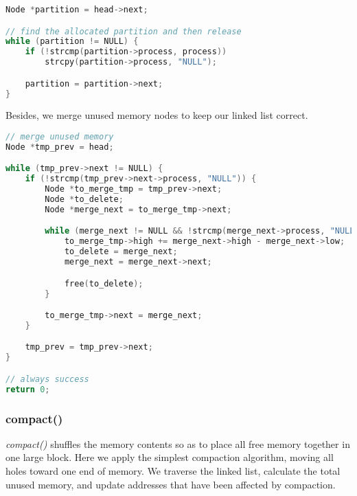 \documentclass{article}
\begin{document}
\begin{lstlisting}[language=c, caption={Finding the Occupied Memory}]
Node *partition = head->next;

// find the allocated partition and then release
while (partition != NULL) {
    if (!strcmp(partition->process, process))
        strcpy(partition->process, "NULL");

    partition = partition->next;
}
\end{lstlisting}

Besides, we merge unused memory nodes to keep our linked list correct.

\begin{lstlisting}[language=c, caption={Merging the Unused Memory}]
// merge unused memory
Node *tmp_prev = head;

while (tmp_prev->next != NULL) {
    if (!strcmp(tmp_prev->next->process, "NULL")) {
        Node *to_merge_tmp = tmp_prev->next;
        Node *to_delete;
        Node *merge_next = to_merge_tmp->next;

        while (merge_next != NULL && !strcmp(merge_next->process, "NULL")) {
            to_merge_tmp->high += merge_next->high - merge_next->low;
            to_delete = merge_next;
            merge_next = merge_next->next;

            free(to_delete);
        }

        to_merge_tmp->next = merge_next;
    }

    tmp_prev = tmp_prev->next;
}

// always success
return 0;
\end{lstlisting}

\subsubsection*{compact()}
\textit{compact()} shuffles the memory contents so as to place all free memory together in one large block. Here we apply the simplest compaction algorithm, moving all holes toward one end of memory. We traverse the linked list, calculate the total unused memory, and update addresses that have been affected by compaction. 
\end{document}
